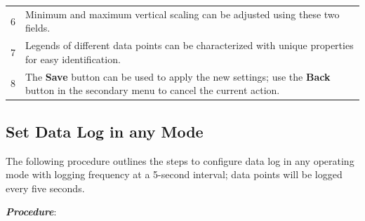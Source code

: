 \begin{longtable}[]{@{}|l|l|@{}}
\begin{minipage}[t]{0.07\columnwidth}
6\strut
\end{minipage} & \begin{minipage}[t]{0.88\columnwidth}\raggedright
Minimum and maximum vertical scaling can be adjusted using these two
fields.\strut
\end{minipage}\tabularnewline
\begin{minipage}[t]{0.07\columnwidth}\raggedright
7\strut
\end{minipage} & \begin{minipage}[t]{0.88\columnwidth}\raggedright
Legends of different data points can be characterized with unique
properties for easy identification.\strut
\end{minipage}\tabularnewline
\begin{minipage}[t]{0.07\columnwidth}\raggedright
8\strut
\end{minipage} & \begin{minipage}[t]{0.88\columnwidth}\raggedright
The \textbf{Save} button can be used to apply the new settings; use the
\textbf{Back} button in the secondary menu to cancel the current
action.\strut
\end{minipage}\tabularnewline
\bottomrule
\end{longtable}


\subsection{Set Data Log in any
Mode}

The following procedure outlines the steps to configure data log in any
operating mode with logging frequency at a 5-second interval; data
points will be logged every five seconds.

\textbf{\emph{Procedure}}:

